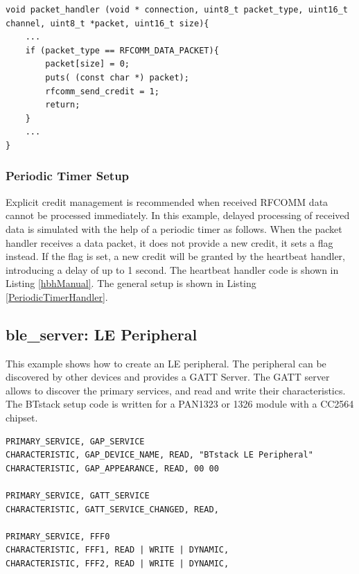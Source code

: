 \documentclass[a4paper,titlepage,oneside,12pt]{amsart} %
\begin{document}
\begin{lstlisting}[float, caption= Packet handler with manual credit management. , label=phManual]
void packet_handler (void * connection, uint8_t packet_type, uint16_t channel, uint8_t *packet, uint16_t size){
    ...
    if (packet_type == RFCOMM_DATA_PACKET){
        packet[size] = 0;
        puts( (const char *) packet);
        rfcomm_send_credit = 1;
        return;
    }
    ...
}
\end{lstlisting}


\subsubsection{Periodic Timer Setup}

Explicit credit management is recommended when received RFCOMM data cannot be processed immediately. In this example, delayed processing of received data is simulated with the help of a periodic timer as follows. When the packet handler receives a data packet, it does not provide a new credit, it sets a flag instead. If the flag is set, a new credit will be granted by the heartbeat handler, introducing a delay of up to 1 second. The heartbeat handler code is shown in Listing \ref{hbhManual}. The general setup is shown in Listing \ref{PeriodicTimerHandler}.


\subsection {ble\_server: LE Peripheral}
\label{example:ble_browser}

This example shows how to create an LE peripheral. The peripheral can be discovered by other devices and provides a GATT Server. The GATT server allows to discover the primary services, and read and write their characteristics. The BTstack setup code is written for a PAN1323 or 1326 module with a CC2564 chipset.

\begin{lstlisting}[float, caption=ATT Database ., label=code:lePeripheralDatabase]
PRIMARY_SERVICE, GAP_SERVICE
CHARACTERISTIC, GAP_DEVICE_NAME, READ, "BTstack LE Peripheral"
CHARACTERISTIC, GAP_APPEARANCE, READ, 00 00

PRIMARY_SERVICE, GATT_SERVICE
CHARACTERISTIC, GATT_SERVICE_CHANGED, READ,

PRIMARY_SERVICE, FFF0
CHARACTERISTIC, FFF1, READ | WRITE | DYNAMIC, 
CHARACTERISTIC, FFF2, READ | WRITE | DYNAMIC, 
\end{lstlisting}
\end{document}
